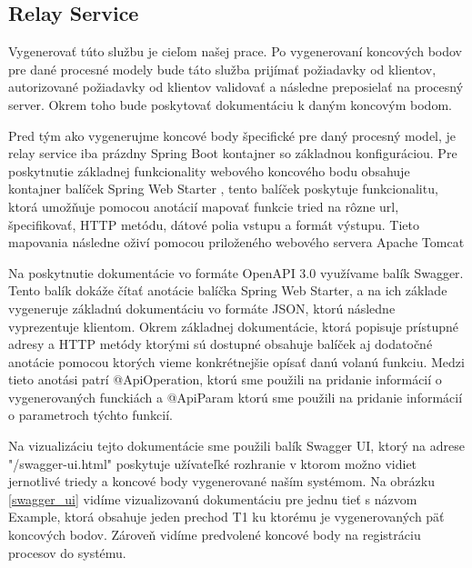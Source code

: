 \subsection{Relay Service} 

Vygenerovať túto službu je cieľom našej prace. Po vygenerovaní koncových bodov pre dané procesné modely bude táto služba prijímať požiadavky od klientov, autorizované požiadavky od klientov validovať a následne preposielať na procesný server. Okrem toho bude poskytovať dokumentáciu k daným koncovým bodom. 

Pred tým ako vygenerujme koncové body špecifické pre daný procesný model, je relay service iba prázdny Spring Boot kontajner so základnou konfiguráciou. Pre poskytnutie základnej funkcionality webového koncového bodu obsahuje kontajner balíček Spring Web Starter \cite{webstarter}, tento balíček poskytuje funkcionalitu, ktorá umožňuje pomocou anotácií mapovať funkcie tried na rôzne \acrshort{url}, špecifikovať, HTTP metódu, dátové polia vstupu a formát výstupu. Tieto mapovania následne oživí pomocou priloženého webového servera Apache Tomcat \cite{tomcat} 

Na poskytnutie dokumentácie vo formáte OpenAPI 3.0 \cite{openapi} využívame balík Swagger. Tento balík dokáže čítať anotácie balíčka Spring Web Starter, a na ich základe vygeneruje základnú dokumentáciu vo formáte JSON, ktorú následne vyprezentuje klientom. Okrem základnej dokumentácie, ktorá popisuje prístupné adresy a HTTP metódy ktorými sú dostupné obsahuje balíček aj dodatočné anotácie pomocou ktorých vieme konkrétnejšie opísať danú volanú funkciu. Medzi tieto anotási patrí @ApiOperation, ktorú sme použili na pridanie informácií o vygenerovaných funckiách a @ApiParam ktorú sme použili na pridanie informácií o parametroch týchto funkcií. 

Na vizualizáciu tejto dokumentácie sme použili balík Swagger UI, ktorý na adrese "/swagger-ui.html" poskytuje užívateľké rozhranie v ktorom možno vidiet jernotlivé triedy a koncové body vygenerované naším systémom. Na obrázku \ref{swagger_ui} vidíme vizualizovanú dokumentáciu pre jednu tieť s názvom Example, ktorá obsahuje jeden prechod T1 ku ktorému je vygenerovaných päť koncových bodov. Zároveň vidíme predvolené koncové body na registráciu procesov do systému.  

